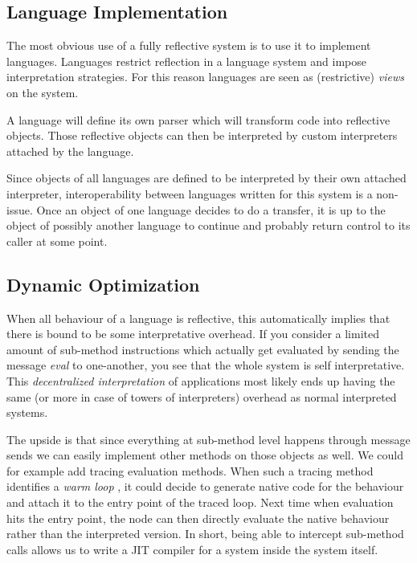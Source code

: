 \documentclass{article}
\begin{document}
\subsection{Language Implementation}
The most obvious use of a fully reflective system is to use it to
implement languages. Languages restrict reflection in a language
system and impose interpretation strategies. For this reason languages
are seen as (restrictive) \emph{views} on the system.

A language will define its own parser which will transform code into
reflective objects. Those reflective objects can then be interpreted
by custom interpreters attached by the language.

Since objects of all languages are defined to be interpreted by their
own attached interpreter, interoperability between languages written
for this system is a non-issue. Once an object of one language decides
to do a transfer, it is up to the object of possibly another language
to continue and probably return control to its caller at some point.

\subsection{Dynamic Optimization}
When all behaviour of a language is reflective, this automatically
implies that there is bound to be some interpretative overhead. If you
consider a limited amount of sub-method instructions which actually
get evaluated by sending the message \emph{eval} to one-another, you
see that the whole system is self interpretative. This
\emph{decentralized interpretation} of applications most likely ends
up having the same (or more in case of towers of interpreters)
overhead as normal interpreted systems.

The upside is that since everything at sub-method level happens
through message sends we can easily implement other methods on those
objects as well. We could for example add tracing evaluation methods.
When such a tracing method identifies a \emph{warm loop} \cite{JIT},
it could decide to generate native code for the behaviour and attach
it to the entry point of the traced loop. Next time when evaluation
hits the entry point, the node can then directly evaluate the native
behaviour rather than the interpreted version. In short, being able to
intercept sub-method calls allows us to write a JIT compiler for a
system inside the system itself.
\end{document}
